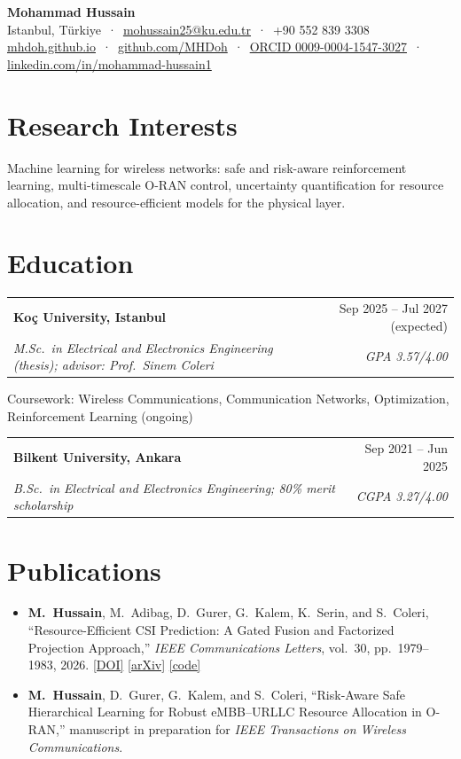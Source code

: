 \documentclass[10pt,a4paper]{article}
\makeatletter
\newcommand{\entry}[4]{%
  \noindent\begin{tabular*}{\linewidth}{@{}l@{\extracolsep{\fill}}r@{}}
    \textbf{#1} & #2 \\
    \textit{#3} & \textit{#4}
  \end{tabular*}\par}
\makeatother
\begin{document}
\begin{center}
  {\LARGE\bfseries Mohammad Hussain}\\[3pt]
  Istanbul, Türkiye \,·\, \href{mailto:mohussain25@ku.edu.tr}{mohussain25@ku.edu.tr} \,·\, +90 552 839 3308\\[1pt]
  \href{https://mhdoh.github.io}{mhdoh.github.io} \,·\, \href{https://github.com/MHDoh}{github.com/MHDoh} \,·\,
  \href{https://orcid.org/0009-0004-1547-3027}{ORCID 0009-0004-1547-3027} \,·\,
  \href{https://www.linkedin.com/in/mohammad-hussain1/}{linkedin.com/in/mohammad-hussain1}
\end{center}

\section{Research Interests}
Machine learning for wireless networks: safe and risk-aware reinforcement learning, multi-timescale O-RAN control,
uncertainty quantification for resource allocation, and resource-efficient models for the physical layer.

\section{Education}
\entry{Koç University, Istanbul}{Sep 2025 -- Jul 2027 (expected)}
      {M.Sc.\ in Electrical and Electronics Engineering (thesis); advisor: Prof.\ Sinem Coleri}{GPA 3.57/4.00}
\vspace{1pt}
{\small Coursework: Wireless Communications, Communication Networks, Optimization, Reinforcement Learning (ongoing)}
\vspace{3pt}

\entry{Bilkent University, Ankara}{Sep 2021 -- Jun 2025}
      {B.Sc.\ in Electrical and Electronics Engineering; 80\% merit scholarship}{CGPA 3.27/4.00}

\section{Publications}
\begin{itemize}[leftmargin=2.1em,label={}]
  \item[{[J1]}] \textbf{M.~Hussain}, M.~Adibag, D.~Gurer, G.~Kalem, K.~Serin, and S.~Coleri, ``Resource-Efficient CSI Prediction:
        A Gated Fusion and Factorized Projection Approach,'' \textit{IEEE Communications Letters}, vol.~30, pp.~1979--1983, 2026.
        \href{https://doi.org/10.1109/LCOMM.2026.3691476}{[DOI]}
        \href{https://arxiv.org/abs/2605.06578}{[arXiv]}
        \href{https://github.com/MHDoh/resource-efficient-csi-prediction}{[code]}
  \item[{[M1]}] \textbf{M.~Hussain}, D.~Gurer, G.~Kalem, and S.~Coleri, ``Risk-Aware Safe Hierarchical Learning for Robust
        eMBB--URLLC Resource Allocation in O-RAN,'' manuscript in preparation for \textit{IEEE Transactions on Wireless Communications}.
\end{itemize}
\end{document}
